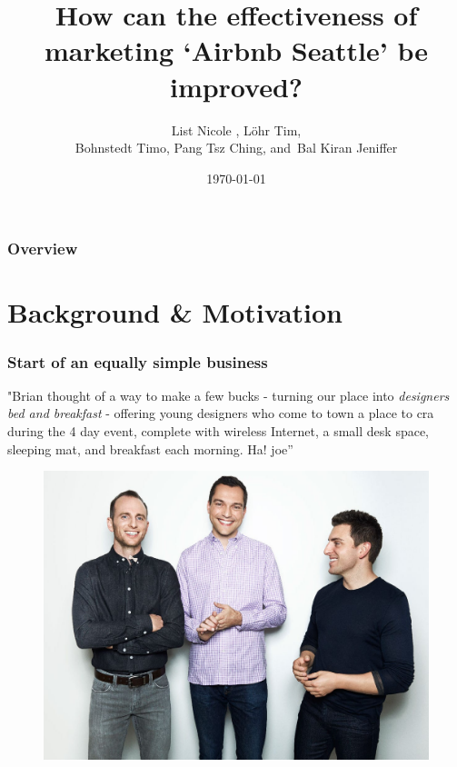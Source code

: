 \documentclass{beamer}
\title[Improve Airbnb's marketing]{How can the effectiveness of marketing ‘Airbnb Seattle’ be improved?} %
\author{List Nicole ,
      L\"ohr Tim,\\
      Bohnstedt Timo,
      Pang Tsz Ching,
      and~Bal Kiran Jeniffer%
      }
\institute[Information Systems] %
{
City University of Hong Kong\\ %
\medskip
\textit{Project Presentation
Machine Learning for Business IS4861 } 
}
\date{\today} %
\begin{document}
\begin{frame}
\titlepage %
\end{frame}
\begin{frame}
\frametitle{Overview} %
\tableofcontents %
\end{frame}
%

\section{Background \& Motivation}

\begin{frame}
\frametitle{Start of an equally simple business}
"Brian thought of a way to make a few bucks - turning
our place into \textit{designers bed and breakfast} - offering young
designers who come to town a place to cra during the 4 day
event, complete with wireless Internet, a small desk space,
sleeping mat, and breakfast each morning. Ha!
joe”
\begin{figure}
\includegraphics[width=0.4\linewidth]{photo/founders}
\end{figure}
\end{frame}
\end{document}
